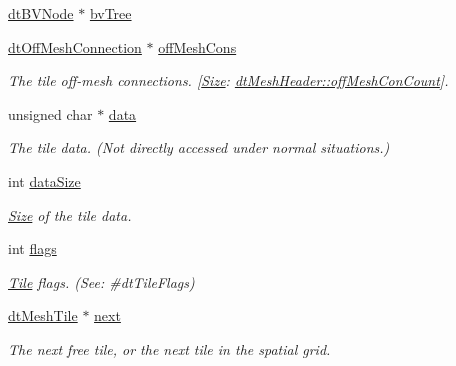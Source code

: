 \begin{DoxyCompactItemize}
\hyperlink{structdtBVNode}{dt\+B\+V\+Node} $\ast$ \hyperlink{structdtMeshTile_a3f95d402afe888c121e4ed155a739f8e}{bv\+Tree}
\item 
\mbox{\label{structdtMeshTile_af9532a80865e4096a95e041e67f24a90}} 
\hyperlink{structdtOffMeshConnection}{dt\+Off\+Mesh\+Connection} $\ast$ \hyperlink{structdtMeshTile_af9532a80865e4096a95e041e67f24a90}{off\+Mesh\+Cons}
\begin{DoxyCompactList}\small\item\em The tile off-\/mesh connections. \mbox{[}\hyperlink{classSize}{Size}\+: \hyperlink{structdtMeshHeader_af48a70c7ce5f5fd586eb8e66dfe8ea36}{dt\+Mesh\+Header\+::off\+Mesh\+Con\+Count}\mbox{]}. \end{DoxyCompactList}\item 
\mbox{\label{structdtMeshTile_a07298ea5bdb89506f71b2944e27610ad}} 
unsigned char $\ast$ \hyperlink{structdtMeshTile_a07298ea5bdb89506f71b2944e27610ad}{data}
\begin{DoxyCompactList}\small\item\em The tile data. (Not directly accessed under normal situations.) \end{DoxyCompactList}\item 
\mbox{\label{structdtMeshTile_a18351bec79954247bef6e22745d5515f}} 
int \hyperlink{structdtMeshTile_a18351bec79954247bef6e22745d5515f}{data\+Size}
\begin{DoxyCompactList}\small\item\em \hyperlink{classSize}{Size} of the tile data. \end{DoxyCompactList}\item 
\mbox{\label{structdtMeshTile_a610bc670e7bd056f31d8629d9c2100a1}} 
int \hyperlink{structdtMeshTile_a610bc670e7bd056f31d8629d9c2100a1}{flags}
\begin{DoxyCompactList}\small\item\em \hyperlink{structTile}{Tile} flags. (See\+: \#dt\+Tile\+Flags) \end{DoxyCompactList}\item 
\mbox{\label{structdtMeshTile_a55480843bb2c9d4d3e277963922bfaae}} 
\hyperlink{structdtMeshTile}{dt\+Mesh\+Tile} $\ast$ \hyperlink{structdtMeshTile_a55480843bb2c9d4d3e277963922bfaae}{next}
\begin{DoxyCompactList}\small\item\em The next free tile, or the next tile in the spatial grid. \end{DoxyCompactList}\end{DoxyCompactItemize}


